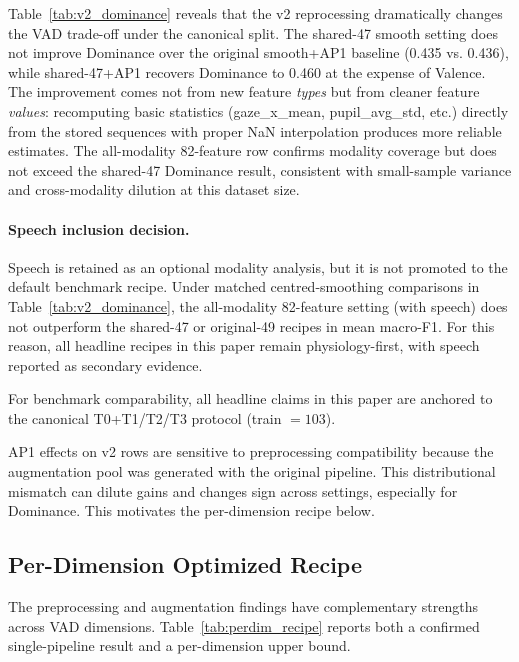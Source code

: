 \documentclass[sigconf,review,anonymous]{acmart}
\begin{document}
Table~\ref{tab:v2_dominance} reveals that the v2 reprocessing dramatically
changes the VAD trade-off under the canonical split.
The shared-47 smooth setting does not improve Dominance over the original
smooth+AP1 baseline (0.435 vs.
0.436), while shared-47+AP1 recovers Dominance to 0.460 at the expense of
Valence.
The improvement comes not from new feature \emph{types} but from cleaner
feature \emph{values}: recomputing basic statistics (gaze\_x\_mean,
pupil\_avg\_std, etc.) directly from the stored sequences with proper NaN
interpolation produces more reliable estimates.
The all-modality 82-feature row confirms modality coverage but does not exceed
the shared-47 Dominance result, consistent with small-sample variance and
cross-modality dilution at this dataset size.

\paragraph{Speech inclusion decision.}
Speech is retained as an optional modality analysis, but it is not promoted to
the default benchmark recipe.
Under matched centred-smoothing comparisons in
Table~\ref{tab:v2_dominance}, the all-modality 82-feature setting (with speech)
does not outperform the shared-47 or original-49 recipes in mean macro-F1.
For this reason, all headline recipes in this paper remain physiology-first,
with speech reported as secondary evidence.

For benchmark comparability, all headline claims in this paper are anchored
to the canonical T0+T1/T2/T3 protocol (train $=103$).

AP1 effects on v2 rows are sensitive to preprocessing compatibility because
the augmentation pool was generated with the original pipeline.
This distributional mismatch can dilute gains and changes sign across settings,
especially for Dominance.
This motivates the per-dimension recipe below.

\subsection{Per-Dimension Optimized Recipe}
\label{sec:perdim_recipe}

The preprocessing and augmentation findings have complementary strengths
across VAD dimensions.
Table~\ref{tab:perdim_recipe} reports both a confirmed single-pipeline result
and a per-dimension upper bound.
\end{document}
